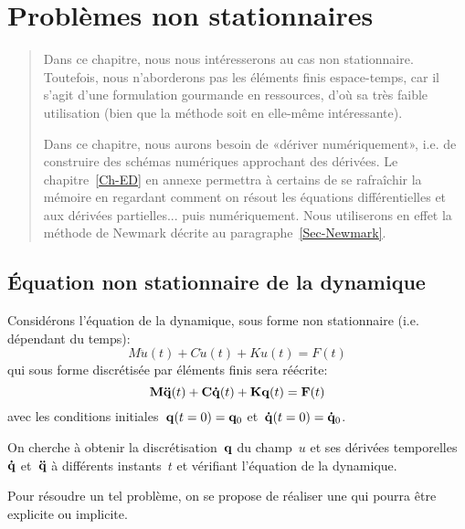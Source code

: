 \chapter{Problèmes non stationnaires}\label{Ch-temps}
\begin{abstract}
Dans ce chapitre, nous nous intéresserons au cas non stationnaire. Toutefois, nous n'aborderons pas les éléments finis espace-temps, car il s'agit d'une formulation gourmande en ressources, d'où sa très faible utilisation (bien que la méthode soit en elle-même intéressante).

Dans ce chapitre, nous aurons besoin de «dériver numériquement», i.e. de construire des schémas numériques approchant des dérivées. Le chapitre~\ref{Ch-ED} en annexe permettra à certains de se rafraîchir la mémoire en regardant comment on résout les équations différentielles et aux dérivées partielles... puis numériquement. Nous utiliserons en effet la méthode de Newmark décrite au paragraphe~\ref{Sec-Newmark}.
\end{abstract}

\medskip
\section{Équation non stationnaire de la dynamique}

Considérons l'équation de la dynamique, sous forme non stationnaire (i.e. dépendant du temps):
\begin{equation} M \ddot u(t) + C \dot u(t) + K u(t)= F(t) \end{equation}
qui sous forme discrétisée par éléments finis sera réécrite:
\begin{equation} \MM{M}\VV{\ddot q}(t) + \MM{C}\VV{\dot q}(t) + \MM{K}\VV{q}(t)= \VV{F}(t) \end{equation}
avec les conditions initiales~$\VV{q}(t=0)=\VV{q}_0$ et~$\VV{\dot q}(t=0)=\VV{\dot q}_0$.

\medskip
On cherche à obtenir la discrétisation~$\VV{q}$ du champ~$u$ et ses dérivées temporelles~$\VV{\dot q}$ et~$\VV{\ddot q}$ à différents instants~$t$ et vérifiant l'équation de la dynamique.

\medskip
Pour résoudre un tel problème, on se propose de réaliser une  qui pourra être explicite ou implicite.

